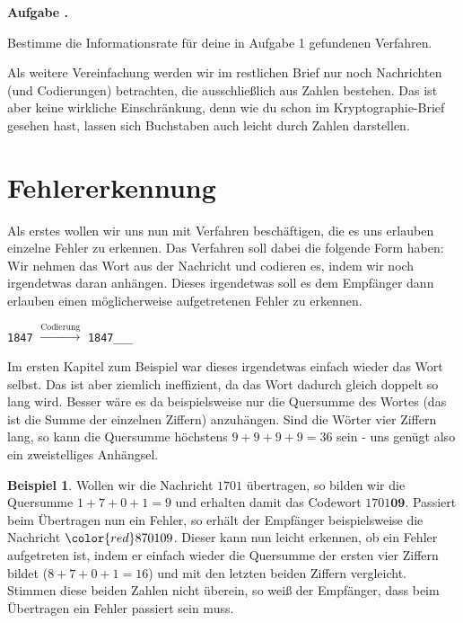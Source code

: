 \documentclass[a4paper,ngerman,12pt]{scrartcl}
\newcommand{\red}[1]{{\color{red}#1}}
\theoremstyle{definition}
\newtheorem{bsp}[defn]{Beispiel}
\theoremstyle{plain}
\theoremstyle{remark}
\newlength{\aufgabenskip}
\newcounter{aufgabennummer}
\newenvironment{aufgabe}[1]{
	\addtocounter{aufgabennummer}{1}
	\textbf{Aufgabe \theaufgabennummer.} \emph{#1} \par
}{\vspace{\aufgabenskip}}
\begin{document}
\begin{aufgabe}{}\label{aufgabe:verdreifachungsCodierungIR}
	Bestimme die Informationsrate für deine in Aufgabe 1 gefundenen Verfahren.
\end{aufgabe}

Als weitere Vereinfachung werden wir im restlichen Brief nur noch Nachrichten (und Codierungen) betrachten, die ausschließlich aus Zahlen bestehen. Das ist aber keine wirkliche Einschränkung, denn wie du schon im Kryptographie-Brief gesehen hast, lassen sich Buchstaben auch leicht durch Zahlen darstellen.


\section{Fehlererkennung}

Als erstes wollen wir uns nun mit Verfahren beschäftigen, die es uns erlauben einzelne Fehler zu erkennen. Das Verfahren soll dabei die folgende Form haben: Wir nehmen das Wort aus der Nachricht und codieren es, indem wir noch \glqq irgendetwas\grqq{} daran anhängen. Dieses \glqq irgendetwas\grqq{} soll es dem Empfänger dann erlauben einen möglicherweise aufgetretenen Fehler zu erkennen.
	\begin{center}
		\texttt{1847} $\xrightarrow{\text{Codierung}}$ \texttt{1847\_\_\_}
	\end{center}

Im ersten Kapitel zum Beispiel war dieses \glqq irgendetwas\grqq{} einfach wieder das Wort selbst. Das ist aber ziemlich ineffizient, da das Wort dadurch gleich doppelt so lang wird. Besser wäre es da beispielsweise nur die Quersumme des Wortes (das ist die Summe der einzelnen Ziffern) anzuhängen. Sind die Wörter vier Ziffern lang, so kann die Quersumme höchstens $9+9+9+9=36$ sein - uns genügt also ein zweistelliges Anhängsel.

\begin{bsp}
	Wollen wir die Nachricht $1701$ übertragen, so bilden wir die Quersumme $1+7+0+1=9$ und erhalten damit das Codewort $1701\textbf{09}$. Passiert beim Übertragen nun ein Fehler, so erhält der Empfänger beispielsweise die Nachricht $\red{8}70109$. Dieser kann nun leicht erkennen, ob ein Fehler aufgetreten ist, indem er einfach wieder die Quersumme der ersten vier Ziffern bildet ($8+7+0+1=16$) und mit den letzten beiden Ziffern vergleicht. Stimmen diese beiden Zahlen nicht überein, so weiß der Empfänger, dass beim Übertragen ein Fehler passiert sein muss.
\end{bsp}
\end{document}

